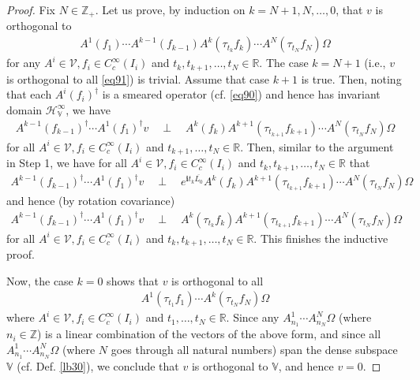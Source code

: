 \documentclass[12pt,b5paper,notitlepage]{article}
\theoremstyle{definition}
\theoremstyle{plain}
\newcommand{\mc}{\mathcal}
\newcommand{\ovl}{\overline}
\newcommand{\im}{\mathbf{i}}
\newcommand{\Vbb}{\mathbb V}
\newcommand{\Zbb}{\mathbb Z}
\newcommand{\Rbb}{\mathbb R}
\newcommand{\HV}{\mathcal H_{\mathbb V}}
\numberwithin{equation}{section}
\begin{document}
\begin{proof}
Fix $N\in\Zbb_+$. Let us prove, by induction on $k=N+1,N,\dots,0$, that $v$ is orthogonal to 
\begin{align*}
A^1(f_1)\cdots A^{k-1}(f_{k-1})A^k(\tau_{t_k}f_k)\cdots A^N(\tau_{t_N}f_N)\Omega
\end{align*}
for any $A^i\in\mc V,f_i\in C_c^\infty(I_i)$ and $t_k,t_{k+1},\dots,t_N\in\Rbb$. The case $k=N+1$ (i.e., $v$ is orthogonal to all \eqref{eq91}) is trivial. Assume that case $k+1$ is true. Then, noting that each $A^i(f_i)^\dagger$ is a smeared operator (cf. \eqref{eq90}) and hence has invariant domain $\HV^\infty$, we have
\begin{align*}
A^{k-1}(f_{k-1})^\dagger\cdots A^1(f_1)^\dagger v\quad\perp\quad A^k(f_k) A^{k+1}(\tau_{t_{k+1}}f_{k+1})\cdots A^N(\tau_{t_N}f_N)\Omega
\end{align*}
for all $A^i\in\mc V,f_i\in C_c^\infty(I_i)$ and $t_{k+1},\dots,t_N\in\Rbb$. Then, similar to the argument in Step 1, we have for all $A^i\in\mc V,f_i\in C_c^\infty(I_i)$ and $t_k,t_{k+1},\dots,t_N\in\Rbb$ that
\begin{align*}
A^{k-1}(f_{k-1})^\dagger\cdots A^1(f_1)^\dagger v\quad\perp\quad e^{\im t_k\ovl{L_0}}A^k(f_k) A^{k+1}(\tau_{t_{k+1}}f_{k+1})\cdots A^N(\tau_{t_N}f_N)\Omega
\end{align*}
and hence (by rotation covariance)
\begin{align*}
A^{k-1}(f_{k-1})^\dagger\cdots A^1(f_1)^\dagger v\quad\perp\quad A^k(\tau_{t_k}f_k) A^{k+1}(\tau_{t_{k+1}}f_{k+1})\cdots A^N(\tau_{t_N}f_N)\Omega
\end{align*}
for all $A^i\in\mc V,f_i\in C_c^\infty(I_i)$ and $t_k,t_{k+1},\dots,t_N\in\Rbb$. This finishes the inductive proof.

Now, the case $k=0$ shows that $v$ is orthogonal to all
\begin{align*}
A^1(\tau_{t_1}f_1)\cdots A^k(\tau_{t_N}f_N)\Omega
\end{align*}
where $A^i\in\mc V,f_i\in C_c^\infty(I_i)$ and $t_1,\dots,t_N\in\Rbb$. Since any $A^1_{n_1}\cdots A^N_{n_N}\Omega$ (where $n_i\in\Zbb$) is a linear combination of the vectors of the above form, and since all $A^1_{n_1}\cdots A^N_{n_N}\Omega$ (where $N$ goes through all natural numbers) span the dense subspace $\Vbb$ (cf. Def. \ref{lb30}), we conclude that $v$ is orthogonal to $\Vbb$, and hence $v=0$.
\end{proof}


\subsection{}
\end{document}
